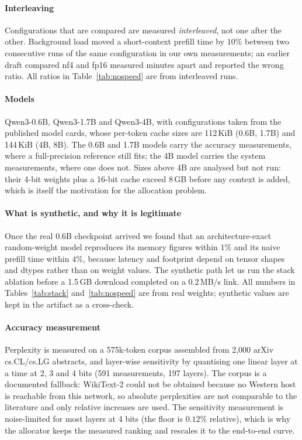 \documentclass[5p]{elsarticle}
\begin{document}
\paragraph*{Interleaving}
Configurations that are compared are measured \emph{interleaved}, not one after
the other. Background load moved a short-context prefill time by $10\%$ between
two consecutive runs of the same configuration in our own measurements; an
earlier draft compared nf4 and fp16 measured minutes apart and reported the
wrong ratio. All ratios in Table~\ref{tab:nospeed} are from interleaved runs.

\paragraph*{Models}
Qwen3-0.6B, Qwen3-1.7B and Qwen3-4B, with configurations taken from the
published model cards, whose per-token cache sizes are 112\,KiB (0.6B, 1.7B) and 144\,KiB (4B, 8B). The 0.6B and 1.7B models carry
the accuracy measurements, where a full-precision reference still fits; the 4B
model carries the system measurements, where one does not. Sizes above 4B are
analysed but not run: their 4-bit weights plus a 16-bit cache exceed 8\,GB
before any context is added, which is itself the motivation for the allocation
problem.

\paragraph*{What is synthetic, and why it is legitimate}
Once the real 0.6B checkpoint arrived we found that an architecture-exact
random-weight model reproduces its memory figures within $1\%$ and its naive
prefill time within $4\%$, because latency and footprint depend on tensor shapes
and dtypes rather than on weight values. The synthetic path let us run the stack
ablation before a 1.5\,GB download completed on a $0.2$\,MB/s link. All numbers
in Tables~\ref{tab:stack} and~\ref{tab:nospeed} are from real weights; synthetic
values are kept in the artifact as a cross-check.

\paragraph*{Accuracy measurement}
Perplexity is measured on a 575k-token corpus assembled from 2{,}000 arXiv
cs.CL/cs.LG abstracts, and layer-wise sensitivity by quantising one linear
layer at a time at 2, 3 and 4 bits (591 measurements, 197 layers). The corpus
is a documented fallback: WikiText-2 could not be obtained because no Western
host is reachable from this network, so absolute perplexities are not
comparable to the literature and only relative increases are used. The
sensitivity measurement is noise-limited for most layers at 4 bits (the floor is
$0.12\%$ relative), which is why the allocator keeps the measured ranking and
rescales it to the end-to-end curve.
\end{document}
